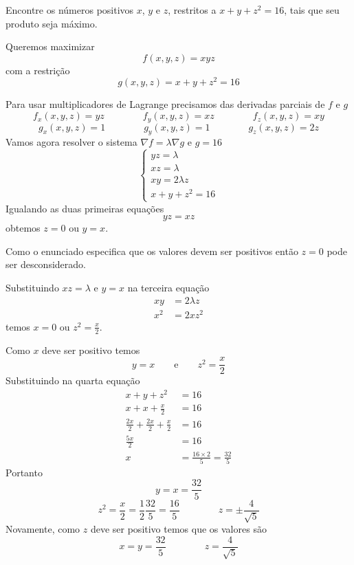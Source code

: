 \documentclass[a4paper,12pt,fleqn]{article}
\begin{document}
Encontre os números positivos $x$, $y$ e $z$, restritos a \(x+y+z^2=16\),
tais que seu produto seja máximo.

\begin{answer}
  Queremos maximizar
  \[
    f(x, y, z) = xyz
  \]
  com a restrição
  \[
    g(x, y, z) = x + y + z^2 = 16
  \]

  Para usar multiplicadores de Lagrange precisamos das derivadas parciais de $f$ e $g$
  \[
    f_x(x, y, z) = yz \qquad\qquad
    f_y(x, y, z) = xz \qquad\qquad
    f_z(x, y, z) = xy
  \]
  \[
    g_x(x, y, z) = 1 \qquad\qquad
    g_y(x, y, z) = 1 \qquad\qquad
    g_z(x, y, z) = 2z
  \]
  Vamos agora resolver o sistema \(\nabla f = \lambda\nabla g\) e \(g=16\)
  \[
    \begin{cases}
      yz = \lambda \\
      xz = \lambda \\
      xy = 2\lambda z \\
      x + y + z^2 = 16
    \end{cases}
  \]
  Igualando as duas primeiras equações
  \[
    yz = xz
  \]
  obtemos \(z=0\) ou \(y=x\).

  Como o enunciado especifica que os valores devem ser positivos então
  $z=0$ pode ser desconsiderado.

  Substituindo \(xz = \lambda\) e \(y=x\) na terceira equação
  \begin{align*}
    xy  & = 2\lambda z \\
    x^2 & = 2xz^2
  \end{align*}
  temos \(x=0\) ou \(z^2=\frac{x}{2}\).

  Como $x$ deve ser positivo temos
  \[
    y = x \qquad\text{e}\qquad z^2=\frac{x}{2}
  \]
  Substituindo na quarta equação
  \begin{align*}
    x + y + z^2 & = 16 \\[2mm]
    x + x + \frac{x}{2} & = 16 \\[2mm]
    \frac{2x}{2} + \frac{2x}{2} + \frac{x}{2} & = 16 \\[2mm]
    \frac{5x}{2} & = 16 \\[2mm]
    x & = \frac{16\times 2}{5} = \frac{32}{5}
  \end{align*}
  Portanto
  \[
    y = x = \frac{32}{5}
  \]
  \[
    z^2 = \frac{x}{2} = \frac{1}{2}\frac{32}{5} = \frac{16}{5}
    \qquad\qquad
    z = \pm \frac{4}{\sqrt{5}}
  \]
  Novamente, como $z$ deve ser positivo temos que os valores são
  \[
    x = y = \frac{32}{5} \qquad\qquad
    z = \frac{4}{\sqrt{5}}
  \]
\end{answer}

\end{document}
